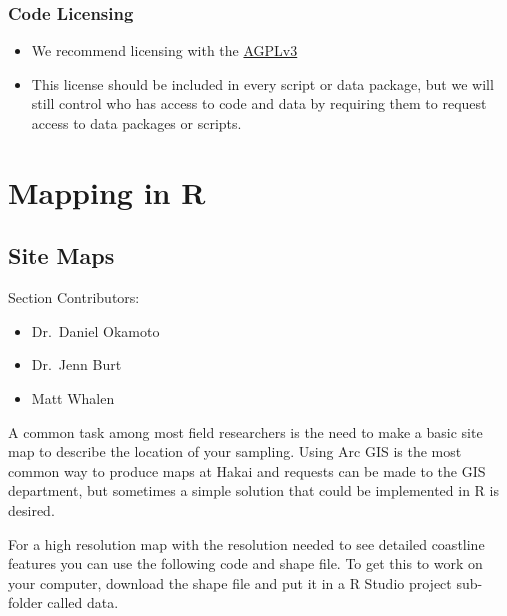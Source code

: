 \documentclass[]{book}
\providecommand{\tightlist}{%
  \setlength{\itemsep}{0pt}\setlength{\parskip}{0pt}}
\begin{document}
\subsection{Code Licensing}\label{code-licensing}

\begin{itemize}
\item
  We recommend licensing with the
  \href{https://choosealicense.com/licenses/agpl-3.0/}{AGPLv3}
\item
  This license should be included in every script or data package, but
  we will still control who has access to code and data by requiring
  them to request access to data packages or scripts.
\end{itemize}

\chapter{Mapping in R}\label{mapping-in-r}

\section{Site Maps}\label{site-maps}

Section Contributors:

\begin{itemize}
\tightlist
\item
  Dr.~Daniel Okamoto
\item
  Dr.~Jenn Burt
\item
  Matt Whalen
\end{itemize}

A common task among most field researchers is the need to make a basic
site map to describe the location of your sampling. Using Arc GIS is the
most common way to produce maps at Hakai and requests can be made to the
GIS department, but sometimes a simple solution that could be
implemented in R is desired.

For a high resolution map with the resolution needed to see detailed
coastline features you can use the following code and shape file. To get
this to work on your computer, download the shape file and put it in a R
Studio project sub-folder called data.
\end{document}
